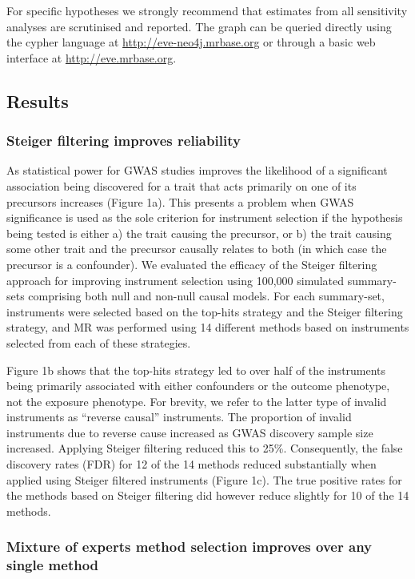 \documentclass[]{article}
\begin{document}
For specific hypotheses we strongly recommend that estimates from all
sensitivity analyses are scrutinised and reported. The graph can be
queried directly using the cypher language at
\url{http://eve-neo4j.mrbase.org} or through a basic web interface at
\url{http://eve.mrbase.org}.

\subsection{Results}\label{results}

\subsubsection{Steiger filtering improves
reliability}\label{steiger-filtering-improves-reliability}

As statistical power for GWAS studies improves the likelihood of a
significant association being discovered for a trait that acts primarily
on one of its precursors increases (Figure 1a). This presents a problem
when GWAS significance is used as the sole criterion for instrument
selection if the hypothesis being tested is either a) the trait causing
the precursor, or b) the trait causing some other trait and the
precursor causally relates to both (in which case the precursor is a
confounder). We evaluated the efficacy of the Steiger filtering approach
for improving instrument selection using 100,000 simulated summary-sets
comprising both null and non-null causal models. For each summary-set,
instruments were selected based on the top-hits strategy and the Steiger
filtering strategy, and MR was performed using 14 different methods
based on instruments selected from each of these strategies.

Figure 1b shows that the top-hits strategy led to over half of the
instruments being primarily associated with either confounders or the
outcome phenotype, not the exposure phenotype. For brevity, we refer to
the latter type of invalid instruments as ``reverse causal''
instruments. The proportion of invalid instruments due to reverse cause
increased as GWAS discovery sample size increased. Applying Steiger
filtering reduced this to 25\%. Consequently, the false discovery rates
(FDR) for 12 of the 14 methods reduced substantially when applied using
Steiger filtered instruments (Figure 1c). The true positive rates for
the methods based on Steiger filtering did however reduce slightly for
10 of the 14 methods.

\subsubsection{Mixture of experts method selection improves over any
single
method}\label{mixture-of-experts-method-selection-improves-over-any-single-method}
\end{document}
